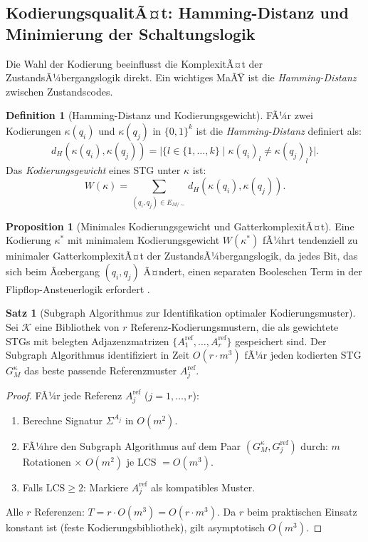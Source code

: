 ﻿\documentclass[a4paper,12pt]{article}
\theoremstyle{definition}
\newtheorem{definition}{Definition}
\newtheorem{satz}{Satz}
\newtheorem{proposition}{Proposition}
\begin{document}
\subsection{KodierungsqualitÃ¤t: Hamming-Distanz und Minimierung der Schaltungslogik}

Die Wahl der Kodierung beeinflusst die KomplexitÃ¤t der ZustandsÃ¼bergangslogik direkt.
Ein wichtiges MaÃŸ ist die \emph{Hamming-Distanz} zwischen Zustandscodes.

\begin{definition}[Hamming-Distanz und Kodierungsgewicht]\label{def:hamming}
  FÃ¼r zwei Kodierungen $\kappa(q_i)$ und $\kappa(q_j)$ in $\{0,1\}^k$ ist die
  \emph{Hamming-Distanz} definiert als:
  \[
    d_H(\kappa(q_i), \kappa(q_j))
    = \bigl|\bigl\{l \in \{1,\ldots,k\} \;\big|\; \kappa(q_i)_l \neq \kappa(q_j)_l\bigr\}\bigr|.
  \]
  Das \emph{Kodierungsgewicht} eines STG unter $\kappa$ ist:
  \[
    W(\kappa) = \sum_{(q_i, q_j) \in E_{M/{\sim}}} d_H(\kappa(q_i), \kappa(q_j)).
  \]
\end{definition}

\begin{proposition}[Minimales Kodierungsgewicht und GatterkomplexitÃ¤t]\label{prop:gatter}
  Eine Kodierung $\kappa^*$ mit minimalem Kodierungsgewicht $W(\kappa^*)$ fÃ¼hrt tendenziell
  zu minimaler GatterkomplexitÃ¤t der ZustandsÃ¼bergangslogik, da jedes Bit, das sich beim
  Ãœbergang $(q_i, q_j)$ Ã¤ndert, einen separaten Booleschen Term in der
  Flipflop-Ansteuerlogik erfordert \cite[S.~100]{ciletti2011}.
\end{proposition}

\begin{satz}[Subgraph Algorithmus zur Identifikation optimaler Kodierungsmuster]\label{satz:optkod}
  Sei $\mathcal{K}$ eine Bibliothek von $r$ Referenz-Kodierungsmustern, die als
  gewichtete STGs mit belegten Adjazenzmatrizen $\{A_1^{\text{ref}}, \ldots, A_r^{\text{ref}}\}$
  gespeichert sind. Der Subgraph Algorithmus identifiziert in Zeit $O(r \cdot m^3)$
  fÃ¼r jeden kodierten STG $G_M^\kappa$ das beste passende Referenzmuster $A_j^{\text{ref}}$.
\end{satz}

\begin{proof}
  FÃ¼r jede Referenz $A_j^{\text{ref}}$ ($j = 1, \ldots, r$):
  \begin{enumerate}
    \item Berechne Signatur $\Sigma^{A_j}$ in $O(m^2)$.
    \item FÃ¼hre den Subgraph Algorithmus auf dem Paar $(G_M^\kappa, G_j^{\text{ref}})$
          durch: $m$ Rotationen $\times$ $O(m^2)$ je LCS $= O(m^3)$.
    \item Falls $\text{LCS} \geq 2$: Markiere $A_j^{\text{ref}}$ als kompatibles Muster.
  \end{enumerate}
  Alle $r$ Referenzen: $T = r \cdot O(m^3) = O(r \cdot m^3)$. Da $r$ beim praktischen
  Einsatz konstant ist (feste Kodierungsbibliothek), gilt asymptotisch $O(m^3)$.
\end{proof}
\end{document}
